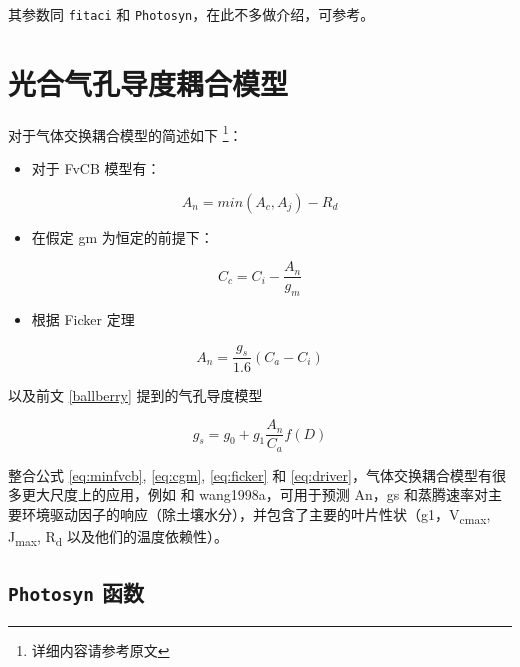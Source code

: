 \documentclass[]{krantz}
\providecommand{\tightlist}{%
  \setlength{\itemsep}{0pt}\setlength{\parskip}{0pt}}
\theoremstyle{definition}
\theoremstyle{definition}
\theoremstyle{definition}
\theoremstyle{remark}
\begin{document}
其参数同 \texttt{fitaci} 和
\texttt{Photosyn}，在此不多做介绍，可参考\citep[\citet{Buckley2014Is},
\citet{Medlyn2011Reconciling}]{Cowan1977Stomatal}。

\cleardoublepage

\chapter{光合气孔导度耦合模型}

\citet{Duursma2015Plantecophys} 对于气体交换耦合模型的简述如下
\footnote{详细内容请参考原文}：

\begin{itemize}
\tightlist
\item
  对于 FvCB 模型有：
\end{itemize}

\begin{equation}
A_n = min(A_c, A_j)-R_d
\label{eq:minfvcb}
\end{equation}

\begin{itemize}
\tightlist
\item
  在假定 gm 为恒定的前提下：
\end{itemize}

\begin{equation}
C_c = C_i - \frac{A_n}{g_m}
\label{eq:cgm}
\end{equation}

\begin{itemize}
\tightlist
\item
  根据 Ficker 定理
\end{itemize}

\begin{equation}
A_n = \frac{g_s}{1.6}(C_a - C_i)
\label{eq:ficker}
\end{equation}

以及前文 \ref{ballberry} 提到的气孔导度模型

\begin{equation}
g_s = g_0 + g_1 \frac{A_n}{C_a} f(D)
\label{eq:driver}
\end{equation}

整合公式 \eqref{eq:minfvcb}, \eqref{eq:cgm}, \eqref{eq:ficker} 和
\eqref{eq:driver}，气体交换耦合模型有很多更大尺度上的应用，例如
\citet{Duursma2012MAESPA} 和 wang1998a，可用于预测 An，gs
和蒸腾速率对主要环境驱动因子的响应（除土壤水分），并包含了主要的叶片性状（g1，V\textsubscript{cmax},
J\textsubscript{max}, R\textsubscript{d} 以及他们的温度依赖性）。

\section{\texorpdfstring{\texttt{Photosyn}
函数}{Photosyn 函数}}\label{photosyn-}
\end{document}
